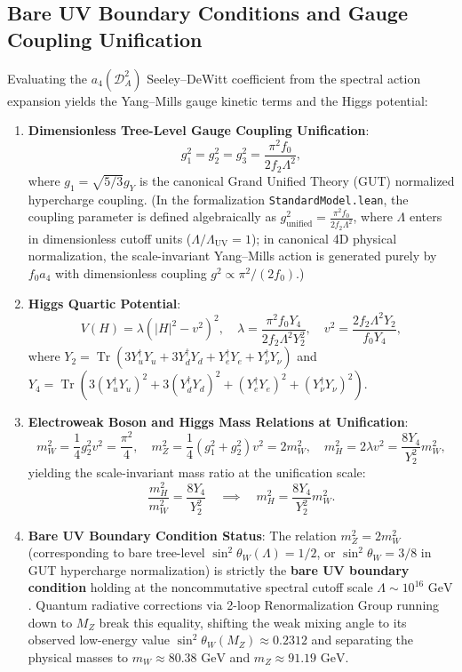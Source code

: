 \documentclass[11pt,a4paper]{article}
\theoremstyle{definition}
\DeclareMathOperator{\Tr}{Tr}
\begin{document}
\subsection{Bare UV Boundary Conditions and Gauge Coupling Unification}
Evaluating the $a_4(\mathcal{D}_A^2)$ Seeley--DeWitt coefficient from the spectral action expansion yields the Yang--Mills gauge kinetic terms and the Higgs potential:
\begin{enumerate}
\item \textbf{Dimensionless Tree-Level Gauge Coupling Unification}:
\begin{equation}
g_1^2 = g_2^2 = g_3^2 = \frac{\pi^2 f_0}{2 f_2 \Lambda^2},
\end{equation}
where $g_1 = \sqrt{5/3} g_Y$ is the canonical Grand Unified Theory (GUT) normalized hypercharge coupling. (In the formalization \texttt{StandardModel.lean}, the coupling parameter is defined algebraically as $g_{\mathrm{unified}}^2 = \frac{\pi^2 f_0}{2 f_2 \Lambda^2}$, where $\Lambda$ enters in dimensionless cutoff units ($\Lambda / \Lambda_{\mathrm{UV}} = 1$); in canonical 4D physical normalization, the scale-invariant Yang--Mills action is generated purely by $f_0 a_4$ with dimensionless coupling $g^2 \propto \pi^2 / (2 f_0)$.)
\item \textbf{Higgs Quartic Potential}:
\begin{equation}
V(H) = \lambda \left( |H|^2 - v^2 \right)^2, \quad \lambda = \frac{\pi^2 f_0 Y_4}{2 f_2 \Lambda^2 Y_2^2}, \quad v^2 = \frac{2 f_2 \Lambda^2 Y_2}{f_0 Y_4},
\end{equation}
where $Y_2 = \Tr(3 Y_u^\dagger Y_u + 3 Y_d^\dagger Y_d + Y_e^\dagger Y_e + Y_\nu^\dagger Y_\nu)$ and $Y_4 = \Tr(3 (Y_u^\dagger Y_u)^2 + 3 (Y_d^\dagger Y_d)^2 + (Y_e^\dagger Y_e)^2 + (Y_\nu^\dagger Y_\nu)^2)$.
\item \textbf{Electroweak Boson and Higgs Mass Relations at Unification}:
\begin{equation}
m_W^2 = \frac{1}{4} g_2^2 v^2 = \frac{\pi^2}{4}, \quad m_Z^2 = \frac{1}{4}(g_1^2 + g_2^2) v^2 = 2 m_W^2, \quad m_H^2 = 2 \lambda v^2 = \frac{8 Y_4}{Y_2^2} m_W^2,
\end{equation}
yielding the scale-invariant mass ratio at the unification scale:
\begin{equation}
\frac{m_H^2}{m_W^2} = \frac{8 Y_4}{Y_2^2} \quad \implies \quad m_H^2 = \frac{8 Y_4}{Y_2^2} m_W^2.
\end{equation}
\item \textbf{Bare UV Boundary Condition Status}:
The relation $m_Z^2 = 2 m_W^2$ (corresponding to bare tree-level $\sin^2 \theta_W(\Lambda) = 1/2$, or $\sin^2 \theta_W = 3/8$ in GUT hypercharge normalization) is strictly the \textbf{bare UV boundary condition} holding at the noncommutative spectral cutoff scale $\Lambda \sim 10^{16}\text{ GeV}$. Quantum radiative corrections via 2-loop Renormalization Group running down to $M_Z$ break this equality, shifting the weak mixing angle to its observed low-energy value $\sin^2 \theta_W(M_Z) \approx 0.2312$ and separating the physical masses to $m_W \approx 80.38\text{ GeV}$ and $m_Z \approx 91.19\text{ GeV}$.
\end{enumerate}
\end{document}
